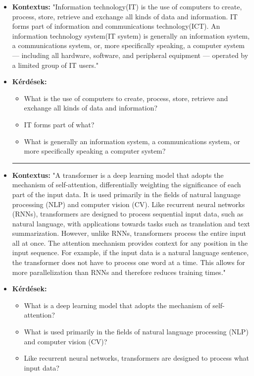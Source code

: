 \begin{itemize}
\item \textbf{Kontextus:} "Information technology(IT) is the use of computers to create, process, store, retrieve and exchange all kinds of data and information. IT forms part of information and communications technology(ICT). An information technology system(IT system) is generally an information system, a communications system, or, more specifically speaking, a computer system — including all hardware, software, and peripheral equipment — operated by a limited group of IT users."
\item \textbf{Kérdések:}
	\begin{itemize}
		\item What is the use of computers to create, process, store, retrieve and exchange all kinds of data and information?
		\item IT forms part of what?
		\item What is generally an information system, a communications system, or more specifically speaking a computer system?
	\end{itemize}

\hrule

\item \textbf{Kontextus:} "A transformer is a deep learning model that adopts the mechanism of self-attention, differentially weighting the significance of each part of the input data. It is used primarily in the fields of natural language processing (NLP) and computer vision (CV). Like recurrent neural networks (RNNs), transformers are designed to process sequential input data, such as natural language, with applications towards tasks such as translation and text summarization. However, unlike RNNs, transformers process the entire input all at once. The attention mechanism provides context for any position in the input sequence. For example, if the input data is a natural language sentence, the transformer does not have to process one word at a time. This allows for more parallelization than RNNs and therefore reduces training times."
\item \textbf{Kérdések:}
	\begin{itemize}
		\item What is a deep learning model that adopts the mechanism of self-attention?
		\item What is used primarily in the fields of natural language processing (NLP) and computer vision (CV)?
		\item Like recurrent neural networks, transformers are designed to process what input data?
	\end{itemize}
\end{itemize}

